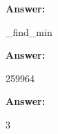 \documentclass[12pt,twoside]{article}
\newcommand{\answer}{
 \par\medskip
 \textbf{Answer:}
}
\newcommand{\answerIIa}{ \answer 
\_find\_min
}
\newcommand{\answerIIb}{ \answer
259964
}
\newcommand{\answerIIc}{ \answer
3
}
\begin{document}
\begin{problems}
%
%
%

\begin{problemparts}

%
%
%
\answerIIa


\answerIIb

\answerIIc 


\end{problemparts}
\end{problems}
\end{document}
